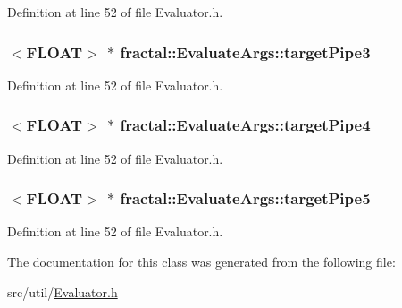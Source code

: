Definition at line 52 of file Evaluator.\+h.

\hypertarget{classfractal_1_1EvaluateArgs_a938e15436e08cad34ad4e3a4fd434074}{
\subsubsection[{target\+Pipe3}]{$<${\bf F\+L\+O\+A\+T}$>$ $\ast$ fractal\+::\+Evaluate\+Args\+::target\+Pipe3}}\label{classfractal_1_1EvaluateArgs_a938e15436e08cad34ad4e3a4fd434074}


Definition at line 52 of file Evaluator.\+h.

\hypertarget{classfractal_1_1EvaluateArgs_af2b1a8c78b4080660bdf0c7753d9252e}{
\subsubsection[{target\+Pipe4}]{$<${\bf F\+L\+O\+A\+T}$>$ $\ast$ fractal\+::\+Evaluate\+Args\+::target\+Pipe4}}\label{classfractal_1_1EvaluateArgs_af2b1a8c78b4080660bdf0c7753d9252e}


Definition at line 52 of file Evaluator.\+h.

\hypertarget{classfractal_1_1EvaluateArgs_abe97827806053e234d60751979a87a39}{
\subsubsection[{target\+Pipe5}]{$<${\bf F\+L\+O\+A\+T}$>$ $\ast$ fractal\+::\+Evaluate\+Args\+::target\+Pipe5}}\label{classfractal_1_1EvaluateArgs_abe97827806053e234d60751979a87a39}


Definition at line 52 of file Evaluator.\+h.



The documentation for this class was generated from the following file\+:\begin{DoxyCompactItemize}
\item 
src/util/\hyperlink{Evaluator_8h}{Evaluator.\+h}\end{DoxyCompactItemize}
